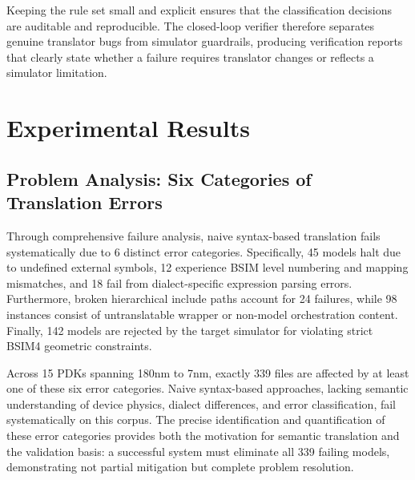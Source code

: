 \documentclass[conference]{IEEEtran}
\begin{document}
Keeping the rule set small and explicit ensures that the classification decisions are auditable and reproducible. The closed-loop verifier therefore separates genuine translator bugs from simulator guardrails, producing verification reports that clearly state whether a failure requires translator changes or reflects a simulator limitation.




\section{Experimental Results}
\label{section:results}

\subsection{Problem Analysis: Six Categories of Translation Errors}
\label{sec:results-problem}

Through comprehensive failure analysis, naive syntax-based translation fails systematically due to 6 distinct error categories. Specifically, 45 models halt due to undefined external symbols, 12 experience BSIM level numbering and mapping mismatches, and 18 fail from dialect-specific expression parsing errors. Furthermore, broken hierarchical include paths account for 24 failures, while 98 instances consist of untranslatable wrapper or non-model orchestration content. Finally, 142 models are rejected by the target simulator for violating strict BSIM4 geometric constraints. 

Across 15 PDKs spanning 180nm to 7nm, exactly 339 files are affected by at least one of these six error categories. Naive syntax-based approaches, lacking semantic understanding of device physics, dialect differences, and error classification, fail systematically on this corpus. The precise identification and quantification of these error categories provides both the motivation for semantic translation and the validation basis: a successful system must eliminate all 339 failing models, demonstrating not partial mitigation but complete problem resolution.
\end{document}
